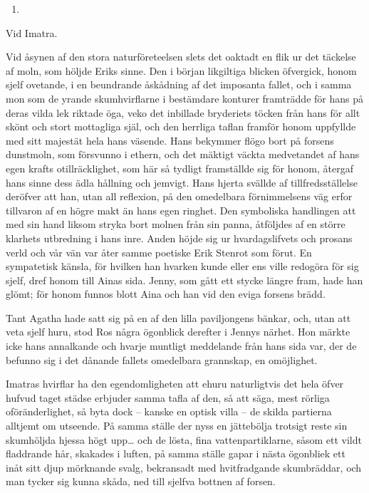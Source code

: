 \begin{enumerate}
\def\labelenumi{\arabic{enumi}.}
\setcounter{enumi}{11}
\tightlist
\item
\end{enumerate}

Vid Imatra.

Vid åsynen af den stora naturföreteelsen slets det oaktadt en flik ur
det täckelse af moln, som höljde Eriks sinne. Den i början likgiltiga
blicken öfvergick, honom sjelf ovetande, i en beundrande åskådning af
det imposanta fallet, och i samma mon som de yrande skumhvirflarne i
bestämdare konturer framträdde för hans på deras vilda lek riktade öga,
veko det inbillade bryderiets töcken från hans för allt skönt och stort
mottagliga själ, och den herrliga taflan framför honom uppfyllde med
sitt majestät hela hans väsende. Hans bekymmer flögo bort på forsens
dunstmoln, som försvunno i ethern, och det mäktigt väckta medvetandet af
hans egen krafts otillräcklighet, som här så tydligt framställde sig för
honom, återgaf hans sinne dess ädla hållning och jemvigt. Hans hjerta
svällde af tillfredsställelse deröfver att han, utan all reflexion, på
den omedelbara förnimmelsens väg erfor tillvaron af en högre makt än
hans egen ringhet. Den symboliska handlingen att med sin hand liksom
stryka bort molnen från sin panna, åtföljdes af en större klarhets
utbredning i hans inre. Anden höjde sig ur hvardagslifvets och prosans
verld och vår vän var åter samme poetiske Erik Stenrot som förut. En
sympatetisk känsla, för hvilken han hvarken kunde eller ens ville
redogöra för sig sjelf, dref honom till Ainas sida. Jenny, som gått ett
stycke längre fram, hade han glömt; för honom funnos blott Aina och han
vid den eviga forsens brädd.

Tant Agatha hade satt sig på en af den lilla paviljongens bänkar, och,
utan att veta sjelf huru, stod Ros några ögonblick derefter i Jennys
närhet. Hon märkte icke hans annalkande och hvarje muntligt meddelande
från hans sida var, der de befunno sig i det dånande fallets omedelbara
grannskap, en omöjlighet.

Imatras hvirflar ha den egendomligheten att ehuru naturligtvis det hela
öfver hufvud taget städse erbjuder samma tafla af den, så att säga, mest
rörliga oföränderlighet, så byta dock -- kanske en optisk villa -- de
skilda partierna alltjemt om utseende. På samma ställe der nyss en
jättebölja trotsigt reste sin skumhöljda hjessa högt upp\ldots{} och de
lösta, fina vattenpartiklarne, såsom ett vildt fladdrande hår, skakades
i luften, på samma ställe gapar i nästa ögonbliek ett inåt sitt djup
mörknande svalg, bekransadt med hvitfradgande skumbräddar, och man
tycker sig kunna skåda, ned till sjelfva bottnen af forsen.

